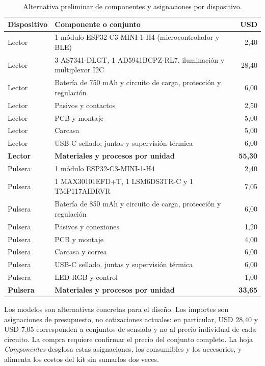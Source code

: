 \begin{table}[H]\centering\small
\caption{Alternativa preliminar de componentes y asignaciones por dispositivo.}
\begin{tabularx}{\linewidth}{l X r}\toprule
Dispositivo & Componente o conjunto & USD\\\midrule
Lector & 1 módulo ESP32-C3-MINI-1-H4 (microcontrolador y BLE) & 2,40\\
Lector & 3 AS7341-DLGT, 1 AD5941BCPZ-RL7, iluminación y multiplexor I2C & 28,40\\
Lector & Batería de 750 mAh y circuito de carga, protección y regulación & 6,00\\
Lector & Pasivos y contactos & 2,50\\
Lector & PCB y montaje & 5,00\\
Lector & Carcasa & 5,00\\
Lector & USB-C sellado, juntas y supervisión térmica & 6,00\\
\textbf{Lector} & \textbf{Materiales y procesos por unidad} & \textbf{55,30}\\\midrule
Pulsera & 1 módulo ESP32-C3-MINI-1-H4 & 2,40\\
Pulsera & 1 MAX30101EFD+T, 1 LSM6DS3TR-C y 1 TMP117AIDRVR & 7,05\\
Pulsera & Batería de 850 mAh y circuito de carga, protección y regulación & 6,00\\
Pulsera & Pasivos y conexiones & 1,20\\
Pulsera & PCB y montaje & 4,00\\
Pulsera & Carcasa y correa & 6,00\\
Pulsera & USB-C sellado, juntas y supervisión térmica & 6,00\\
Pulsera & LED RGB y control & 1,00\\
\textbf{Pulsera} & \textbf{Materiales y procesos por unidad} & \textbf{33,65}\\\bottomrule
\end{tabularx}\end{table}
Los modelos son alternativas concretas para el diseño. Los importes son asignaciones de presupuesto, no cotizaciones actuales: en particular, USD 28,40 y USD 7,05 corresponden a conjuntos de sensado y no al precio individual de cada circuito. La compra requiere confirmar el precio del conjunto completo. La hoja \textit{Componentes} desglosa estas asignaciones, los consumibles y los accesorios, y alimenta los costos del kit sin sumarlos dos veces.

